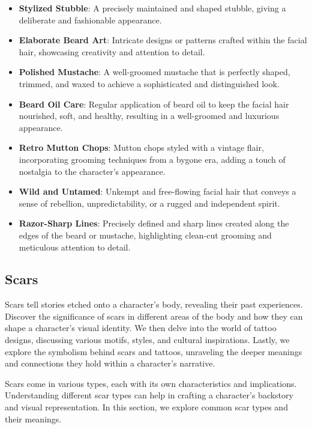 \documentclass[12pt]{book}  %
\begin{document}
\begin{itemize}
    \item \textbf{Stylized Stubble}: A precisely maintained and shaped stubble, giving a deliberate and fashionable appearance.
    \item \textbf{Elaborate Beard Art}: Intricate designs or patterns crafted within the facial hair, showcasing creativity and attention to detail.
    \item \textbf{Polished Mustache}: A well-groomed mustache that is perfectly shaped, trimmed, and waxed to achieve a sophisticated and distinguished look.
    \item \textbf{Beard Oil Care}: Regular application of beard oil to keep the facial hair nourished, soft, and healthy, resulting in a well-groomed and luxurious appearance.
    \item \textbf{Retro Mutton Chops}: Mutton chops styled with a vintage flair, incorporating grooming techniques from a bygone era, adding a touch of nostalgia to the character's appearance.
    \item \textbf{Wild and Untamed}: Unkempt and free-flowing facial hair that conveys a sense of rebellion, unpredictability, or a rugged and independent spirit.
    \item \textbf{Razor-Sharp Lines}: Precisely defined and sharp lines created along the edges of the beard or mustache, highlighting clean-cut grooming and meticulous attention to detail.
\end{itemize}

\subsection{\textbf{Scars}}

Scars tell stories etched onto a character's body, revealing their past experiences. Discover the significance of scars in different areas of the body and how they can shape a character's visual identity. We then delve into the world of tattoo designs, discussing various motifs, styles, and cultural inspirations. Lastly, we explore the symbolism behind scars and tattoos, unraveling the deeper meanings and connections they hold within a character's narrative.

Scars come in various types, each with its own characteristics and implications. Understanding different scar types can help in crafting a character's backstory and visual representation. In this section, we explore common scar types and their meanings.
\end{document}
